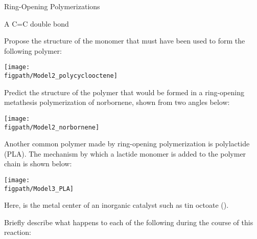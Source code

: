 \begin{activity}{Ring-Opening Polymerizations}
\begin{ctqs}
				\begin{solution}[0.5in]
					A C=C double bond
				\end{solution}
	
	\question Propose the structure of the monomer that must have been used to form the following polymer:
	
	\centerline{\texttt{[image: \\figpath/Model2\_polycyclooctene]}}
			
				\begin{solution}[1.25in]\end{solution}
	
	\question Predict the structure of the polymer that would be formed in a ring-opening metathesis polymerization of norbornene, shown from two angles below:
	
	\centerline{\texttt{[image: \\figpath/Model2\_norbornene]}}
			
				\begin{solution}[1.25in]\end{solution}
	
\end{ctqs}

\vspace{\fill}

\begin{model}[Polylactide]
	\label{\labelbase:mdl:PLA}

	Another common polymer made by ring-opening polymerization is polylactide (PLA).  The mechanism by which a lactide monomer is added to the polymer chain is shown below:
	
	\centerline{\texttt{[image: \\figpath/Model3\_PLA]}}
	
	Here, \ce{[M]} is the metal center of an inorganic catalyst such as tin octoate ().
	
\end{model}

\clearpage
\begin{ctqs}
	
	\question Briefly describe what happens to each of the following during the course of this reaction:
	

\end{ctqs}
\end{activity}
